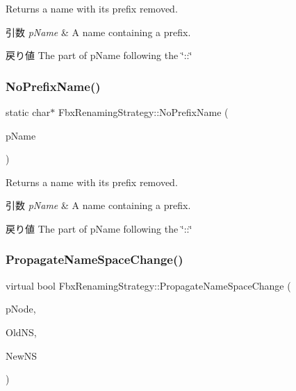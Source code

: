 Returns a name with its prefix removed. 
\begin{DoxyParams}{引数}
{\em p\+Name} & A name containing a prefix. \\
\hline
\end{DoxyParams}
\begin{DoxyReturn}{戻り値}
The part of p\+Name following the \char`\"{}\+::\char`\"{} 
\end{DoxyReturn}
\mbox{\label{class_fbx_renaming_strategy_a82d239d3b92ac672fd6ea71617a5c8e1}} 
\subsubsection{\texorpdfstring{No\+Prefix\+Name()}{NoPrefixName()}\hspace{0.1cm}{\footnotesize\ttfamily [2/2]}}
{\footnotesize\ttfamily static char$\ast$ Fbx\+Renaming\+Strategy\+::\+No\+Prefix\+Name (\begin{DoxyParamCaption}\item[{\hyperlink{class_fbx_string}{Fbx\+String} \&}]{p\+Name }\end{DoxyParamCaption})\hspace{0.3cm}{\ttfamily [static]}}

Returns a name with its prefix removed. 
\begin{DoxyParams}{引数}
{\em p\+Name} & A name containing a prefix. \\
\hline
\end{DoxyParams}
\begin{DoxyReturn}{戻り値}
The part of p\+Name following the \char`\"{}\+::\char`\"{} 
\end{DoxyReturn}
\mbox{\label{class_fbx_renaming_strategy_a7d9e1c1bd9ffb573a54cafbfe138f837}} 
\subsubsection{\texorpdfstring{Propagate\+Name\+Space\+Change()}{PropagateNameSpaceChange()}}
{\footnotesize\ttfamily virtual bool Fbx\+Renaming\+Strategy\+::\+Propagate\+Name\+Space\+Change (\begin{DoxyParamCaption}\item[{\hyperlink{class_fbx_node}{Fbx\+Node} $\ast$}]{p\+Node,  }\item[{\hyperlink{class_fbx_string}{Fbx\+String}}]{Old\+NS,  }\item[{\hyperlink{class_fbx_string}{Fbx\+String}}]{New\+NS }\end{DoxyParamCaption})\hspace{0.3cm}{\ttfamily [virtual]}}

